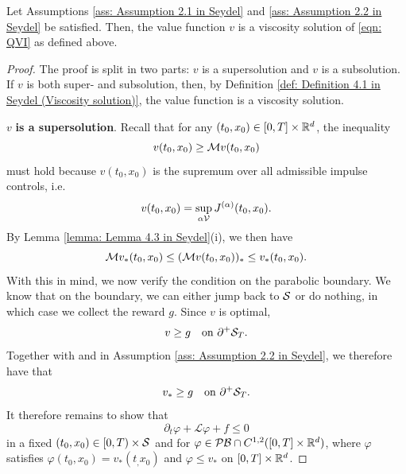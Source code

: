 \begin{theorem}
\label{trm: Existence of the Viscosity Solution}
    Let Assumptions \ref{ass: Assumption 2.1 in Seydel} and \ref{ass: Assumption 2.2 in Seydel} be satisfied. Then, the value function $v$ is a viscosity solution of \eqref{eqn: QVI} as defined above.
\end{theorem}
\begin{proof}
    The proof is split in two parts: $v$ is a supersolution and $v$ is a subsolution. If $v$ is both super- and subsolution, then, by Definition \ref{def: Definition 4.1 in Seydel (Viscosity solution)}, the value function is a viscosity solution. 
    
    $v$ \textbf{is a supersolution}. Recall that for any $(t_0,x_0) \in [0,T] \times \mathbb{R}^d$, the inequality 
    \begin{equation*} 
        v(t_0,x_0) \geq \mathcal{M} v(t_0,x_0)
    \end{equation*} 
    must hold because $v(t_0,x_0)$ is the supremum over all admissible impulse controls, i.e.
    \begin{equation*} 
        v(t_0,x_0) = \sup_{\alpha \mathcal{V}} J^{(\alpha)}(t_0,x_0).
    \end{equation*} 
    By Lemma \ref{lemma: Lemma 4.3 in Seydel}(i), we then have
    \begin{equation}
        \mathcal{M} v_*(t_0,x_0) \leq (\mathcal{M} v(t_0,x_0))_* \leq v_*(t_0,x_0). 
        \label{eqn: v is supersolution, part 1}
    \end{equation}
    With this in mind, we now verify the condition on the parabolic boundary. We know that on the boundary, we can either jump back to $\mathcal{S}$ or do nothing, in which case we collect the reward $g$. Since $v$ is optimal,
    \begin{equation*}
        v \geq g \quad \text{on } \partial^+ \mathcal{S}_T.
    \end{equation*}
    Together with  and  in Assumption \ref{ass: Assumption 2.2 in Seydel}, we therefore have that
    \begin{equation}
        v_* \geq g \quad \text{on } \partial^+ \mathcal{S}_T.
        \label{eqn: v is supersolution, part 2}
    \end{equation}
    It therefore remains to show that 
    \begin{equation*}
        \partial_t \varphi + \mathcal L \varphi + f \leq 0
    \end{equation*}
    in a fixed $(t_0,x_0) \in [0,T) \times \mathcal{S}$ and for $\varphi \in  \mathcal{PB} \cap C^{1,2}([0,T] \times \mathbb{R}^d)$, where $\varphi$ satisfies $\varphi (t_0,x_0) = v_*(t_,x_0)$ and $\varphi \leq v_*$ on $[0,T] \times \mathbb{R}^d$. 
    

\end{proof}
